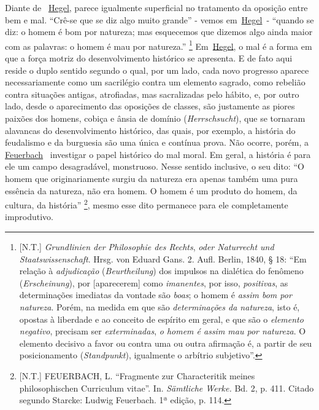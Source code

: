 Diante de
~\href{https://www.marxists.org/portugues/dicionario/verbetes/h/hegel.htm}{Hegel},
parece igualmente superficial no tratamento da oposição entre bem e mal.
``Crê-se que se diz algo muito grande'' - vemos
em~\href{https://www.marxists.org/portugues/dicionario/verbetes/h/hegel.htm}{Hegel}~-
``quando se diz: o homem é bom por natureza; mas esquecemos que dizemos
algo ainda maior com as palavras: o homem é mau por natureza.''
\footnote{{[}N.T.{]} \emph{Grundlinien der Philosophie des Rechts},
  \emph{oder Naturrecht und Staatswissenschaft}. Hrsg. von Eduard Gans.
  2. Aufl. Berlin, 1840, § 18: ``Em relação à \emph{adjudicação}
  (\emph{Beurtheilung}) dos impulsos na dialética do fenômeno
  (\emph{Erscheinung}), por {[}aparecerem{]} como \emph{imanentes}, por
  isso, \emph{positivas}, as determinações imediatas da vontade são
  \emph{boas}; o homem é \emph{assim bom por natureza}. Porém, na medida
  em que são \emph{determinações da natureza}, isto é, opostas à
  liberdade e ao conceito de espírito em geral, e que são o
  \emph{elemento negativo}, precisam ser \emph{exterminadas}, \emph{o
  homem é assim mau por natureza}. O elemento decisivo a favor ou contra
  uma ou outra afirmação é, a partir de seu posicionamento
  (\emph{Standpunkt}), igualmente o arbítrio subjetivo''.}
\protect\hypertarget{r23}{}{}Em~\href{https://www.marxists.org/portugues/dicionario/verbetes/h/hegel.htm}{Hegel},
o mal é a forma em que a força motriz do desenvolvimento histórico se
apresenta. E de fato aqui reside o duplo sentido segundo o qual, por um
lado, cada novo progresso aparece necessariamente como um sacrilégio
contra um elemento sagrado, como rebelião contra situações antigas,
atrofiadas, mas sacralizadas pelo hábito, e, por outro lado, desde o
aparecimento das oposições de classes, são justamente as piores paixões
dos homens, cobiça e ânsia de domínio (\emph{Herrschsucht}), que se
tornaram alavancas do desenvolvimento histórico, das quais, por exemplo,
a história do feudalismo e da burguesia são uma única e contínua prova.
Não ocorre, porém, a
\href{https://www.marxists.org/portugues/dicionario/verbetes/f/feuerbach.htm}{Feuerbach}~
investigar o papel histórico do mal moral. Em geral, a história é para
ele um campo desagradável, monstruoso. Nesse sentido inclusive, o seu
dito: ``O homem que originariamente surgiu da natureza era apenas também
uma pura essência da natureza, não era homem. O homem é um produto do
homem, da cultura, da história''\protect\hypertarget{r24}{}{} \footnote{{[}N.T.{]}
  FEUERBACH, L. ``Fragmente zur Characteritik meines philosophischen
  Curriculum vitae''. In. \emph{Sämtliche Werke.} Bd. 2, p. 411. Citado
  segundo Starcke: Ludwig Feuerbach. 1ª edição, p. 114.}, mesmo esse
dito permanece para ele completamente improdutivo.

